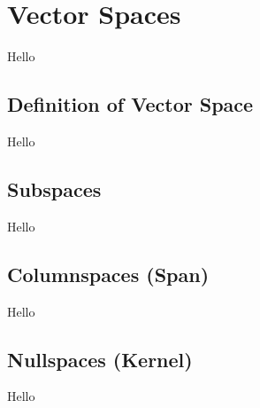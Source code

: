 \chapter{Vector Spaces}
Hello

\section{Definition of Vector Space}
Hello

\section{Subspaces}
Hello

\section{Columnspaces (Span)}
Hello

\section{Nullspaces (Kernel)}
Hello
